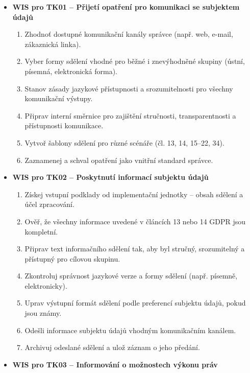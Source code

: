 \begin{itemize}
  \begin{itemize}
    \item \textbf{WIS pro TK01 – Přijetí opatření pro komunikaci se subjektem údajů}
  
    \begin{enumerate}
      \item Zhodnoť dostupné komunikační kanály správce (např. web, e-mail, zákaznická linka).
      \item Vyber formy sdělení vhodné pro běžné i znevýhodněné skupiny (ústní, písemná, elektronická forma).
      \item Stanov zásady jazykové přístupnosti a srozumitelnosti pro všechny komunikační výstupy.
      \item Připrav interní směrnice pro zajištění stručnosti, transparentnosti a přístupnosti komunikace.
      \item Vytvoř šablony sdělení pro různé scénáře (čl. 13, 14, 15–22, 34).
      \item Zaznamenej a schval opatření jako vnitřní standard správce.
    \end{enumerate}

    \item \textbf{WIS pro TK02 – Poskytnutí informací subjektu údajů}
  
    \begin{enumerate}
      \item Získej vstupní podklady od implementační jednotky – obsah sdělení a účel zpracování.
      \item Ověř, že všechny informace uvedené v článcích 13 nebo 14 GDPR jsou kompletní.
      \item Připrav text informačního sdělení tak, aby byl stručný, srozumitelný a přístupný pro cílovou skupinu.
      \item Zkontroluj správnost jazykové verze a formy sdělení (např. písemně, elektronicky).
      \item Uprav výstupní formát sdělení podle preferencí subjektu údajů, pokud jsou známy.
      \item Odešli informace subjektu údajů vhodným komunikačním kanálem.
      \item Archivuj odeslané sdělení a ulož záznam o jeho předání.
    \end{enumerate}

    \item \textbf{WIS pro TK03 – Informování o možnostech výkonu práv}


\end{itemize}
\end{itemize}
